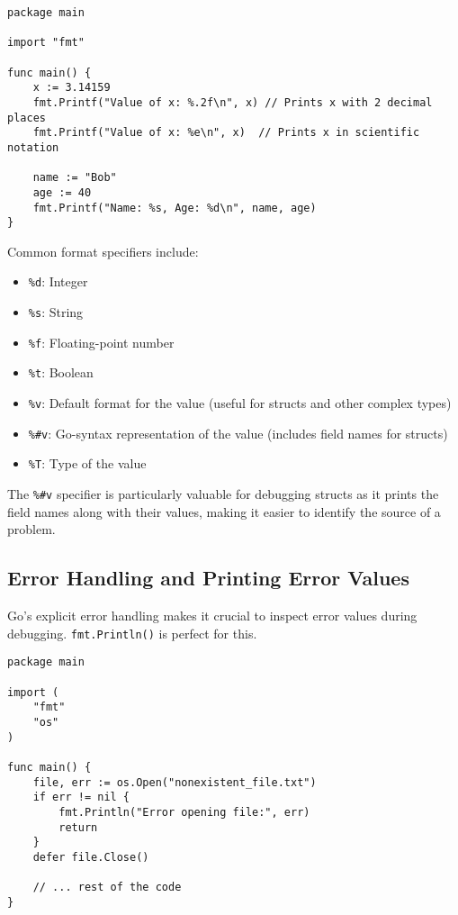 \documentclass{article}
\begin{document}
{{{{\begin{verbatim}
package main

import "fmt"

func main() {
    x := 3.14159
    fmt.Printf("Value of x: %.2f\n", x) // Prints x with 2 decimal places
    fmt.Printf("Value of x: %e\n", x)  // Prints x in scientific notation

    name := "Bob"
    age := 40
    fmt.Printf("Name: %s, Age: %d\n", name, age)
}
\end{verbatim}

Common format specifiers include:

\begin{itemize}
    \item \texttt{\%d}:  Integer
    \item \texttt{\%s}: String
    \item \texttt{\%f}: Floating-point number
    \item \texttt{\%t}: Boolean
    \item \texttt{\%v}: Default format for the value (useful for structs and other complex types)
    \item \texttt{\%#v}: Go-syntax representation of the value (includes field names for structs)
    \item \texttt{\%T}: Type of the value
\end{itemize}

The \texttt{\%#v} specifier is particularly valuable for debugging structs as it prints the field names along with their values, making it easier to identify the source of a problem.

\subsection*{Error Handling and Printing Error Values}

Go's explicit error handling makes it crucial to inspect error values during debugging.  \texttt{fmt.Println()} is perfect for this.

\begin{verbatim}
package main

import (
    "fmt"
    "os"
)

func main() {
    file, err := os.Open("nonexistent_file.txt")
    if err != nil {
        fmt.Println("Error opening file:", err)
        return
    }
    defer file.Close()

    // ... rest of the code
}
\end{verbatim}

}}}}
\end{document}
